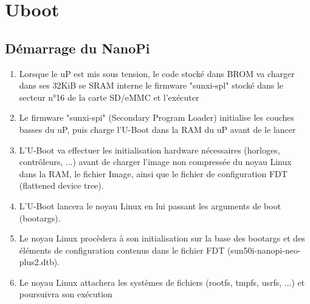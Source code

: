 \section{Uboot}
\subsection{Démarrage du NanoPi}
\begin{enumerate}
\item Lorsque le uP est mis sous tension, le code stocké dans BROM va charger dans ses 32KiB se SRAM interne le firmware "sunxi-spl" stocké dans le secteur n°16 de la carte SD/eMMC et l'exécuter
\item Le firmware "sunxi-spi" (Secondary Program Loader) initialise les couches basses du uP, puis charge l'U-Boot dans la RAM du uP avant de le lancer
\item L'U-Boot va effectuer les initialisation hardware nécessaires (horloges, contrôleurs, ...) avant de charger l'image non compressée du noyau Linux dans la RAM, le fichier Image, ainsi que le fichier de configuration FDT (flattened device tree).
\item L'U-Boot lancera le noyau Linux en lui passant les arguments de boot (bootargs).
\item Le noyau Linux procèdera à son initialisation sur la base des bootargs et des éléments de configuration contenus dans le fichier FDT (sun50i-nanopi-neo-plus2.dtb).
\item Le noyau Linux attachera les systèmes de fichiers (rootfs, tmpfs, usrfs, ...) et poursuivra son exécution
\end{enumerate}
